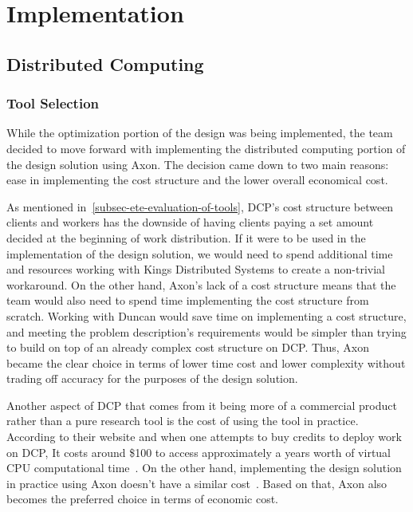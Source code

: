 \documentclass[../mthe-493-final-project.tex]{subfiles}
\begin{document}
    \chapter{Implementation}
    \label{ch:implementation}

    \section{Distributed Computing}
    \label{sec:distributed-computing-implementation}

    \subsection{Tool Selection}
    
    While the optimization portion of the design was being implemented, the team decided to move forward with implementing the distributed computing portion of the design solution using Axon. The decision came down to two main reasons: ease in implementing the cost structure and the lower overall economical cost.

    As mentioned in~\autoref{subsec-ete-evaluation-of-tools}, DCP's cost structure between clients and workers has the downside of having clients paying a set amount decided at the beginning of work distribution. If it were to be used in the implementation of the design solution, we would need to spend additional time and resources working with Kings Distributed Systems to create a non-trivial workaround. On the other hand, Axon's lack of a cost structure means that the team would also need to spend time implementing the cost structure from scratch. Working with Duncan would save time on implementing a cost structure, and meeting the problem description's requirements would be simpler than trying to build on top of an already complex cost structure on DCP. Thus, Axon became the clear choice in terms of lower time cost and lower complexity without trading off accuracy for the purposes of the design solution.

    Another aspect of DCP that comes from it being more of a commercial product rather than a pure research tool is the cost of using the tool in practice. According to their website and when one attempts to buy credits to deploy work on DCP, It costs around \$100 to access approximately a years worth of virtual CPU computational time~\cite{kings-ds-marketing}. On the other hand, implementing the design solution in practice using Axon doesn't have a similar cost~\cite{Mays_Axon}. Based on that, Axon also becomes the preferred choice in terms of economic cost.
    
\end{document}
